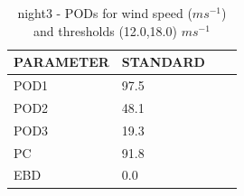 \begin{table}[h!]
\begin{center}
\begin{tabular}{|l|l|l|l|}
\hline
\multicolumn{1}{|c|}{\cellcolor[HTML]{C0C0C0}\textbf{PARAMETER}} & \multicolumn{1}{c|}{\cellcolor[HTML]{C0C0C0}\textbf{STANDARD}} \\
\hline
\cellcolor[HTML]{C0C0C0}POD1  & 97.5   \\
\cellcolor[HTML]{C0C0C0}POD2  & 48.1   \\
\cellcolor[HTML]{C0C0C0}POD3  & 19.3   \\
\cellcolor[HTML]{C0C0C0}PC    & 91.8     \\
\cellcolor[HTML]{C0C0C0}EBD   & 0.0    \\
\hline
\end{tabular}
\caption{night3 - PODs for wind speed ($m s^{-1}$) and thresholds (12.0,18.0) $m s^{-1}$}
\label{tab:podwsFT:night3}
\end{center}
\end{table}

